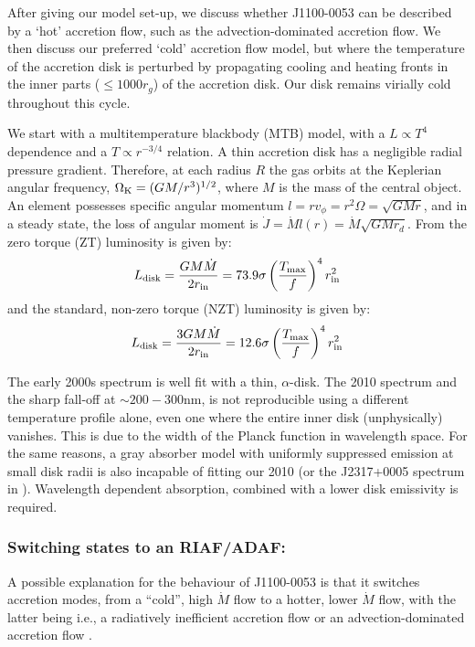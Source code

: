 \documentclass[a4paper,fleqn,usenatbib]{mnras}
\begin{document}
After giving our model set-up, we discuss whether J1100-0053 can be
described by a `hot' accretion flow, such as the advection-dominated
accretion flow. We then discuss our preferred `cold' accretion flow
model, but where the temperature of the accretion disk is perturbed by
propagating cooling and heating fronts in the inner parts ($\leq 1000
r_{g}$) of the accretion disk. Our disk remains virially cold
throughout this cycle.

We start with a multitemperature blackbody (MTB) model, with a $L
\propto T^4$ dependence and a $T \propto r^{-3/4}$ relation. A thin
accretion disk has a negligible radial pressure gradient. Therefore,
at each radius $R$ the gas orbits at the Keplerian angular frequency,
$\Omega_{\rm K} = (GM/r^{3})^{1/2}$, where $M$ is the mass of the
central object.  An element possesses specific angular momentum $l = r
v_{\phi} = r^{2} \Omega = \sqrt{GMr}$, and in a steady state, the loss
of angular moment is $\dot{J} = \dot{M} l(r) = \dot{M}
\sqrt{GMr_{d}}$.  From \citet{Zimmerman2005} the zero torque (ZT)
luminosity is given by:
\begin{equation}
L_{\rm disk}   =  \frac{G M \dot{M}}  {2 r_{\rm in}}    = 73.9 \sigma\left ( \frac{T_{\rm max}}{f}  \right )^{4}  r^{2}_{\rm in} 
\end{equation}
and the standard, non-zero torque (NZT) luminosity is given by:
\begin{equation}
L_{\rm disk} = \frac{3 G M \dot{M}}  {2 r_{\rm in}}    = 12.6 \sigma\left ( \frac{T_{\rm max}}{f}  \right )^{4}  r^{2}_{\rm in} 
\end{equation} 

The early 2000s spectrum is well fit with a thin, \citet{SS73}
$\alpha$-disk. The 2010 spectrum and the sharp fall-off at $\sim
200-300$nm, is not reproducible using a different temperature profile
alone, even one where the entire inner disk (unphysically)
vanishes. This is due to the width of the Planck function in
wavelength space. For the same reasons, a gray absorber model with
uniformly suppressed emission at small disk radii is also incapable of
fitting our 2010 (or the J2317+0005 spectrum in
\citet{Guo2016}). Wavelength dependent absorption, combined with a
lower disk emissivity is required.

\subsubsection{Switching states to an RIAF/ADAF:}
A possible explanation for the behaviour of J1100-0053 is that it
switches accretion modes, from a ``cold'', high $\dot{M}$ flow to a
hotter, lower $\dot{M}$ flow, with the latter being i.e., a
radiatively inefficient accretion flow \citep[RIAF; see reviews by
][]{Narayan1998, Quataert2001} or an advection-dominated accretion
flow \citep[ADAF; ][and references therein]{YuanNarayan2014}.
\end{document}
